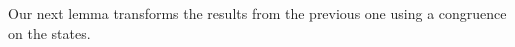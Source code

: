 \begin{code}
    \\
    \>[0]\AgdaSpace{}%
    \AgdaSymbol{\{}\AgdaSymbol{\}}\AgdaSpace{}%
    \AgdaSymbol{\{}\AgdaSymbol{\}}\AgdaSpace{}%
    \AgdaSpace{}%
    \AgdaSpace{}%
    \AgdaSpace{}%
    \AgdaSpace{}%
    \AgdaSymbol{(}\AgdaSpace{}%
    \AgdaSymbol{)}\<%
    \\
    \>[0]\AgdaSpace{}%
    \AgdaSymbol{\{}\AgdaSymbol{\}}\AgdaSpace{}%
    \AgdaSymbol{\{}\AgdaSymbol{\}}\AgdaSpace{}%
    \AgdaSpace{}%
    \AgdaSymbol{|}\AgdaSpace{}%
    \AgdaSpace{}%
    \AgdaSpace{}%
    \AgdaSpace{}%
    \AgdaSpace{}%
    \AgdaSpace{}%
    \<%
    \\
    \>[0]\AgdaSpace{}%
    \AgdaSymbol{\{}\AgdaSymbol{\}}\AgdaSpace{}%
    \AgdaSymbol{\{}\AgdaSymbol{\}}\AgdaSpace{}%
    \AgdaSpace{}%
    \AgdaSymbol{|}\AgdaSpace{}%
    \AgdaSpace{}%
    \AgdaSpace{}%
    \AgdaSymbol{|}\AgdaSpace{}%
    \AgdaSpace{}%
    \AgdaSpace{}%
    \AgdaSymbol{=}\AgdaSpace{}%
    \<%
    \\
    \>[0]\AgdaSpace{}%
    \AgdaSymbol{\{}\AgdaSymbol{\}}\AgdaSpace{}%
    \AgdaSymbol{\{}\AgdaSymbol{\}}\AgdaSpace{}%
    \AgdaSpace{}%
    \AgdaSymbol{|}\AgdaSpace{}%
    \AgdaSpace{}%
    \AgdaSpace{}%
    \AgdaSymbol{|}\AgdaSpace{}%
    \AgdaSpace{}%
    \AgdaSpace{}%
    \AgdaSymbol{=}\AgdaSpace{}%
    \AgdaSpace{}%
    \AgdaSymbol{(}\AgdaSpace{}%
    \AgdaSymbol{)}\<%
\end{code}

Our next lemma transforms the results from the previous one using a congruence on the states.

